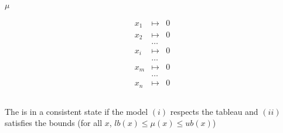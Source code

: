 \begin{frame}
\begin{columns}
  \begin{column}{.3\textwidth}
  \begin{center}
  $\mu$
  \end{center}
  $$
  \begin{array}{rcl}
  x_1 & \mapsto & 0 \\
  x_2 & \mapsto & 0 \\
  & \ldots \\
  x_i & \mapsto & 0 \\
  & \ldots \\
  x_m & \mapsto & 0 \\
  & \ldots \\
  x_n & \mapsto & 0 
  \end{array}
  $$
  \end{column}

  \end{columns}

  \vfill

  The \tsolver is in a consistent state if the model $(i)$ respects the tableau 
  and $(ii)$ satisfies the bounds (for all $x$, $lb(x) \leq \mu(x) \leq ub(x)$)

\end{frame}

